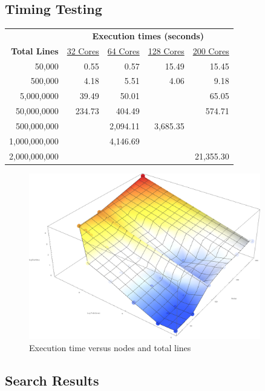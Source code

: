 

%
%

\subsection{Timing Testing}


\begin{tabular}{r r r r r}
 & \multicolumn{4}{c}{\textbf{Execution times (seconds)}} \\
\textbf{Total Lines} & \underline{32 Cores} & \underline{64 Cores} & \underline{128 Cores} & \underline{200 Cores} \\
       50,000 &   0.55 &     0.57 &     15.49 & 15.45 \\
      500,000 &   4.18 &     5.51 &      4.06 & 9.18 \\
   5,000,0000 &  39.49 &    50.01 &           & 65.05 \\
  50,000,0000 & 234.73 &   404.49 &           & 574.71 \\
  500,000,000 &        & 2,094.11 &  3,685.35 & \\
1,000,000,000 &        & 4,146.69 &           &  \\
2,000,000,000 &        &          &           & 21,355.30 \\ 
\end{tabular}

\begin{figure}
\includegraphics[width=0.9\textwidth]{./images/runtimes.png}
\caption{Execution time versus nodes and total lines}
\end{figure}

%
%

\subsection{Search Results}

